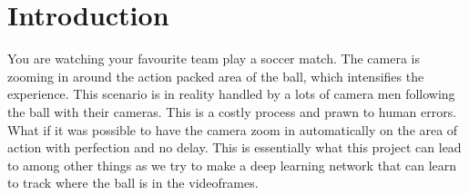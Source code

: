 
\section{Introduction}
You are watching your favourite team play a soccer match. The camera is zooming in around the action packed area of the ball, which intensifies the experience.
This scenario is in reality handled by a lots of camera men following the ball with their cameras. This is a costly process and prawn to human errors. What if it was possible to have the camera zoom in automatically on the area of action with perfection and no delay. This is essentially what this project can lead to among other things as we try to make a deep learning network that can learn to track where the ball is in the videoframes.
